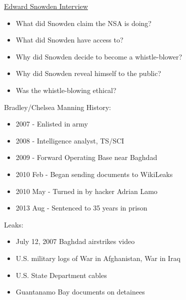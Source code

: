 \documentclass{beamer}
\begin{document}
\begin{frame}{\href{http://www.theguardian.com/world/video/2013/jun/09/nsa-whistleblower-edward-snowden-interview-video}{Edward Snowden Interview}}
\begin{itemize}
\item What did Snowden claim the NSA is doing?
\bigskip
\item What did Snowden have access to?
\bigskip
\item Why did Snowden decide to become a whistle-blower?
\bigskip
\item Why did Snowden reveal himself to the public?
\bigskip
\item Was the whistle-blowing ethical?
\end{itemize}
\end{frame}

\begin{frame}{Bradley/Chelsea Manning}
History:
\begin{itemize}
\item 2007 - Enlisted in army
\item 2008 - Intelligence analyst, TS/SCI
\item 2009 - Forward Operating Base near Baghdad
\item 2010 Feb - Began sending documents to WikiLeaks
\item 2010 May - Turned in by hacker Adrian Lamo
\item 2013 Aug - Sentenced to 35 years in prison
\end{itemize}
Leaks:
\begin{itemize}
\item July 12, 2007 Baghdad airstrikes video %
\item U.S. military logs of War in Afghanistan, War in Iraq  %
\item U.S. State Department cables %
\item Guantanamo Bay documents on detainees %
\end{itemize}
\end{frame}
\end{document}
